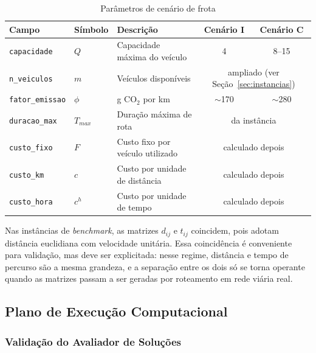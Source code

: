 \documentclass[12pt,a4paper]{article}
\theoremstyle{plain}
\begin{document}
\begin{table}[htbp]
\centering
\caption{Parâmetros de cenário de frota}
\label{tab:estrutura_cenario}
\small
\begin{tabular}{@{}lllcc@{}}
\toprule
\textbf{Campo} & \textbf{Símbolo} & \textbf{Descrição} & \textbf{Cenário I} & \textbf{Cenário C} \\
\midrule
\texttt{capacidade}      & $Q$        & Capacidade máxima do veículo         & 4      & 8--15 \\
\texttt{n\_veiculos}     & $m$        & Veículos disponíveis                 & \multicolumn{2}{c}{ampliado (ver Seção~\ref{sec:instancias})} \\
\texttt{fator\_emissao}  & $\phi$     & g $\text{CO}_2$ por km               & $\sim$170 & $\sim$280 \\
\texttt{duracao\_max}    & $T_{max}$  & Duração máxima de rota               & \multicolumn{2}{c}{da instância} \\
\texttt{custo\_fixo}     & $F$        & Custo fixo por veículo utilizado     & \multicolumn{2}{c}{calculado depois} \\
\texttt{custo\_km}       & $c$        & Custo por unidade de distância       & \multicolumn{2}{c}{calculado depois} \\
\texttt{custo\_hora}     & $c^{h}$    & Custo por unidade de tempo           & \multicolumn{2}{c}{calculado depois} \\
\bottomrule
\end{tabular}
\end{table}

Nas instâncias de \textit{benchmark}, as matrizes $d_{ij}$ e $t_{ij}$ coincidem, pois adotam distância euclidiana com velocidade unitária. Essa coincidência é conveniente para validação, mas deve ser explicitada: nesse regime, distância e tempo de percurso são a mesma grandeza, e a separação entre os dois só se torna operante quando as matrizes passam a ser geradas por roteamento em rede viária real.

\subsection{Plano de Execução Computacional}
\label{sec:resolucao}

\subsubsection{Validação do Avaliador de Soluções}
\end{document}
